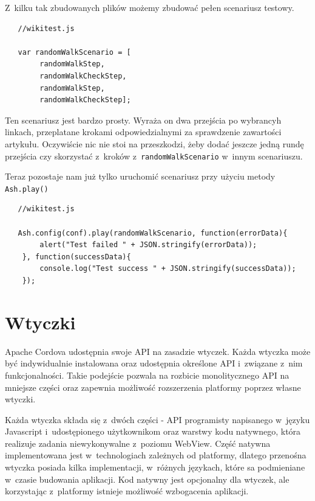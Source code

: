 \documentclass[brudnopis]{xmgr}
\begin{document}
Z~kilku tak zbudowanych plików możemy zbudować pełen scenariusz testowy.

\begin{lstlisting}
   //wikitest.js

   var randomWalkScenario = [
        randomWalkStep,
        randomWalkCheckStep,
        randomWalkStep,
        randomWalkCheckStep];

\end{lstlisting}

Ten scenariusz jest bardzo prosty. Wyraża on dwa przejścia po wybrancyh linkach, przeplatane krokami odpowiedzialnymi za sprawdzenie zawartości artykułu. Oczywiście nic nie stoi na przeszkodzi, żeby dodać jeszcze jedną rundę przejścia czy skorzystać z~kroków z~\texttt{randomWalkScenario} w~innym scenariuszu.

Teraz pozostaje nam już tylko uruchomić scenariusz przy użyciu metody \texttt{Ash.play()}

\begin{lstlisting}
   //wikitest.js

   Ash.config(conf).play(randomWalkScenario, function(errorData){
        alert("Test failed " + JSON.stringify(errorData));
    }, function(successData){
        console.log("Test success " + JSON.stringify(successData));
    });

\end{lstlisting}

\chapter{Wtyczki}

Apache Cordova udostępnia swoje API na zasadzie wtyczek. Każda wtyczka może być indywidualnie instalowana oraz udostępnia określone API i~związane z~nim funkcjonalności. Takie podejście pozwala na rozbicie monolitycznego API na mniejsze części oraz zapewnia możliwość rozszerzenia platformy poprzez własne wtyczki.

Każda wtyczka składa się z~dwóch części - API programisty napisanego w~języku Javascript i~udostępionego użytkownikom oraz warstwy kodu natywnego, która realizuje zadania niewykonywalne z~poziomu WebView. Część natywna implementowana jest w~technologiach zależnych od platformy, dlatego przenośna wtyczka posiada kilka implementacji, w~różnych językach, które sa podmieniane w~czasie budowania aplikacji. Kod natywny jest opcjonalny dla wtyczek, ale korzystając z~platformy istnieje możliwość wzbogacenia aplikacji.
\end{document}
